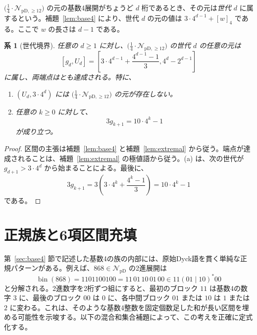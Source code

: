 \documentclass[12pt]{ltjsarticle}
\theoremstyle{plain}
\newtheorem{corollary}[theorem]{系}
\theoremstyle{definition}
\theoremstyle{plain}
\newcommand{\NpD}{\mathcal{N}_{\mathrm{pD}}}
\newcommand{\Pset}{%
  \bigl(\tfrac{1}{4}\cdot\mathcal{N}_{\mathrm{pD},\geq 12}\bigr)%
}
\begin{document}
$\Pset$ の元の基数4展開がちょうど $d$ 桁であるとき、その元は\emph{世代 $d$} に属するという。補題~\ref{lem:base4} により、世代 $d$ の元の値は $3\cdot4^{d-1}+[w]_4$ である。ここで $w$ の長さは $d-1$ である。

\begin{corollary}[世代境界]\label{cor:gen}
任意の $d\geq1$ に対し、$\Pset$ の世代 $d$ の任意の元は
\begin{equation}\label{eq:generation-interval}
  [g_d,U_d]
  =\left[
  3\cdot4^{d-1}+\frac{4^{d-1}-1}{3},
  4^d-2^{d-1}
  \right]
\end{equation}
に属し、両端点はとも達成される。特に、
\begin{enumerate}[label=\textup{(\alph*)}]
\item $(U_d,3\cdot4^d)$ には $\Pset$ の元が存在しない。
\item 任意の $k\geq0$ に対して、
\begin{equation}\label{eq:three-g}
  3g_{k+1}=10\cdot4^k-1
\end{equation}
が成り立つ。
\end{enumerate}
\end{corollary}

\begin{proof}
区間の主張は補題~\ref{lem:base4} と補題~\ref{lem:extremal} から従う。端点が達成されることは、補題~\ref{lem:extremal} の極値語から従う。(a) は、次の世代が $g_{d+1}>3\cdot4^d$ から始まることによる。最後に、
\[
  3g_{k+1}
  =3\left(3\cdot4^k+\frac{4^k-1}{3}\right)
  =10\cdot4^k-1
\]
である。
\end{proof}

\section{正規族と6項区間充填}\label{sec:regular}

第~\ref{sec:base4} 節で記述した基数4の族の内部には、原始Dyck語を貫く単純な正規パターンがある。例えば、$868\in\NpD$ の2進展開は
\[
 \operatorname{bin}(868)=1101100100=11\,01\,10\,01\,00
 \in 11(01\mid10)^*00
\]
と分解される。2進数字を2桁ずつ組にすると、最初のブロック $11$ は基数4の数字 $3$ に、最後のブロック $00$ は $0$ に、各中間ブロック $01$ または $10$ は $1$ または $2$ に変わる。これは、そのような基数4整数を固定個数足した和が長い区間を埋める可能性を示唆する。以下の混合和集合補題によって、この考えを正確に定式化する。
\end{document}
